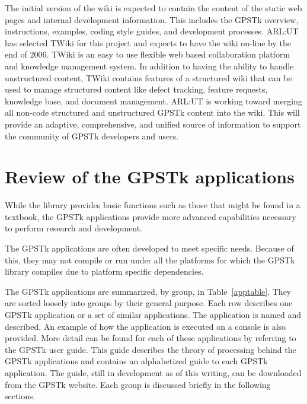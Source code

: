 \documentclass{ion-gps}
\begin{document}
The initial version of the wiki is expected to contain the content of
the static web pages and internal development information.  This
includes the GPSTk overview, instructions, examples, coding style
guides, and development processes.  ARL:UT has selected TWiki
\cite{twiki} for this project and expects to have the wiki on-line by
the end of 2006.  TWiki is an easy to use flexible web based
collaboration platform and knowledge management system.  In addition
to having the ability to handle unstructured content, TWiki contains
features of a structured wiki that can be used to manage structured
content like defect tracking, feature requests, knowledge base, and
document management.  ARL:UT is working toward merging all non-code
structured and unstructured GPSTk content into the wiki. This will
provide an adaptive, comprehensive, and unified source of information
to support the community of GPSTk developers and users.

\section*{Review of the GPSTk applications}

While the library provides basic functions such as those that might be
found in a textbook, the GPSTk applications provide more advanced
capabilities necessary to perform research and development.

The GPSTk applications are often developed to meet specific needs. Because
of this, they may not compile or run under all the platforms for which the
GPSTk library compiles due to platform specific dependencies.

The GPSTk applications are summarized, by group, in
Table~\ref{apptable}. They are sorted loosely into groups by their general 
purpose. Each row describes one GPSTk application or a
set of similar applications. The application is named and
described. An example of how the application is executed on a console
is also provided. More detail can be found for each of these
applications by referring to the GPSTk user
guide. This guide describes the theory of processing behind the GPSTk
applications and contains an alphabetized guide to
each GPSTk application. The guide, still in development as of this
writing, can be downloaded from the GPSTk website\cite{gpstkguide}.
Each group is discussed briefly in the following sections.


%  
\end{document}
